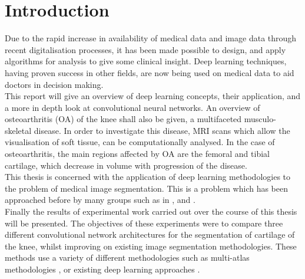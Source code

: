 \documentclass[11pt,a4paper]{memoir}
\numberwithin{figure}{section}
\numberwithin{table}{section}
\numberwithin{equation}{section}
\begin{document}
\clearpage

\begin{KeepFromToc}
 \textsc{ \tableofcontents}
\end{KeepFromToc}
\clearpage
\begin{KeepFromToc}
\listoffigures
 \end{KeepFromToc}
 \clearpage
 \begin{KeepFromToc}
\listoftables
 \end{KeepFromToc}

\mainmatter
\chapter{Introduction}

Due to the rapid increase in availability of medical data and image data through recent digitalisation processes, it has been made possible to design, and apply algorithms for analysis to give some clinical insight. Deep learning techniques, having proven success in other fields, are now being used on medical data to aid doctors in decision making.\\

This report will give an overview of deep learning concepts, their application, and a more in depth look at convolutional neural networks. An overview of osteoarthritis (OA) of the knee shall also be given, a multifaceted musculo-skeletal disease. In order to investigate this disease, MRI scans which allow the visualisation of soft tissue, can be computationally analysed. In the case of osteoarthritis, the main regions affected by OA are the femoral and tibial cartilage, which decrease in volume with progression of the disease\cite{Conaghan2011SummaryGroup.}. \\

This thesis is concerned with the application of deep learning methodologies to the problem of medical image segmentation. This is a problem which has been approached before by many groups such as in \cite{Avendi2016AMRI}, \cite{Zhang2015DeepSegmentation} and \cite{Liao2013RepresentationSegmentation}.\\

Finally the results of experimental work carried out over the course of this thesis will be presented. The objectives of these experiments were to compare three different convolutional network architectures for the segmentation of cartilage of the knee, whilst improving on existing image segmentation methodologies. These methods use a variety of different methodologies such as multi-atlas methodologies \cite{Shan2012AUTOMATICIMAGES.}, or existing deep learning approaches \cite{Prasoon2013DeepNetwork}.\\
\end{document}
